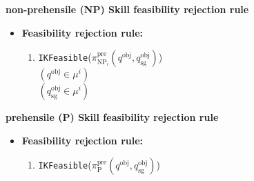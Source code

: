 
\noindent\hrulefill

\noindent \textbf{non-prehensile (NP) Skill feasibility rejection rule}

\begin{itemize}\label{Feasible_rejection:NP}
    \item \textbf{Feasibility rejection rule:}
    \begin{enumerate}
        \item \texttt{IKFeasible}($ \pi^\text{pre}_{\text{NP}_i}(q^\text{obj}, q^\text{obj}_\text{sg})$) \\ $(q^\text{obj} \in \mu^i)$ \\ $(q^\text{obj}_\text{sg} \in \mu^i)$  
    \end{enumerate}

\end{itemize}

\noindent\hrulefill

\noindent\hrulefill

\noindent \textbf{prehensile (P) Skill feasibility rejection rule}

\begin{itemize}\label{Feasible_rejection:P}
    \item \textbf{Feasibility rejection rule:}
    \begin{enumerate}
        \item \texttt{IKFeasible}($ \pi^\text{pre}_\text{P}(q^\text{obj}, q^\text{obj}_\text{sg})$) %
    \end{enumerate}    
\end{itemize}
\noindent\hrulefill
